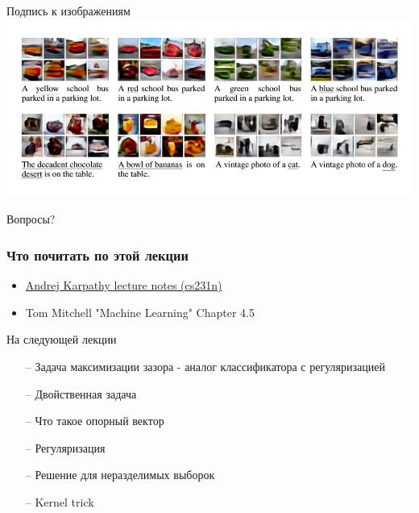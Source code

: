 \documentclass[10pt]{beamer}
\begin{document}
{
\begin{frame}{Подпись к изображениям}
  \centering 
  \includegraphics[width=0.9 \textwidth, keepaspectratio = true]{images/image_gen}   
\end{frame}
}  

\begin{frame}[standout]
  Вопросы?
\end{frame}

\appendix

\begin{frame}\frametitle{Что почитать по этой лекции}
  \begin{itemize}
    \item \href{http://cs231n.github.io/neural-networks-1/}{Andrej Karpathy lecture notes (cs231n)}
    \item Tom Mitchell "Machine Learning" Chapter 4.5
  \end{itemize}
\end{frame}

\begin{frame}{На следующей лекции}
	\begin{itemize}
	  	\item[--] Задача максимизации зазора - аналог классификатора с регуляризацией
    \item[--] Двойственная задача 
    \item[--] Что такое опорный вектор
    \item[--] Регуляризация
    \item[--] Решение для неразделимых выборок
    \item[--] Kernel trick    
	\end{itemize}
\end{frame}
\end{document}
